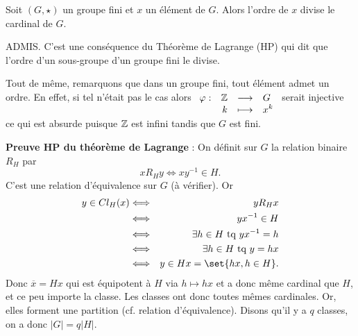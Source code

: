 \documentclass{magnolia}
\begin{document}
  
  

\begin{theoreme}[nom={Théorème de \nom{Lagrange}}]
Soit $(G,\star)$ un groupe fini et $x$ un élément de $G$. Alors l'ordre de $x$
divise le cardinal de $G$.
\end{theoreme}

\begin{preuve}
ADMIS. C'est une conséquence du Théorème de Lagrange (HP) qui dit que l'ordre d'un sous-groupe d'un groupe fini le divise.
\medskip

Tout de même, remarquons que dans un groupe fini, tout élément admet un ordre. En effet, si tel n'était pas le cas alors $\begin{array}[t]{lrcl} \displaystyle{\varphi} : & \displaystyle{\mathbb{Z}} & \longrightarrow & \displaystyle{G} \\ & \displaystyle{k} & \longmapsto & \displaystyle{x^k} \end{array}$ serait injective ce qui est absurde puisque $\mathbb{Z}$ est infini tandis que $G$ est fini.
\bigskip

\textbf{Preuve HP du théorème de Lagrange} :
On définit sur $G$ la relation binaire $R_H$ par $$x R_H y \Longleftrightarrow xy^{-1} \in H.$$
C'est une relation d'équivalence sur $G$ (à vérifier). Or
\begin{eqnarray*}
y\in Cl_H(x) &\Longleftrightarrow& y R_H x \\
&\Longleftrightarrow& yx^{-1}\in H \\
&\Longleftrightarrow& \exists h \in H \text{ tq } yx^{-1}=h \\
&\Longleftrightarrow& \exists h \in H \text{ tq } y=hx \\
&\Longleftrightarrow& y\in Hx=\set{hx, h\in H}.
\end{eqnarray*}
Donc $\overline{x}=Hx$ qui est équipotent à $H$ via $h\mapsto hx$ et a donc même cardinal que $H$, et ce peu importe la classe. Les classes ont donc toutes mêmes cardinales. Or, elles forment une partition (cf. relation d'équivalence). Disons qu'il y a $q$ classes, on a donc $|G|=q|H|$.
\end{preuve}
\end{document}
